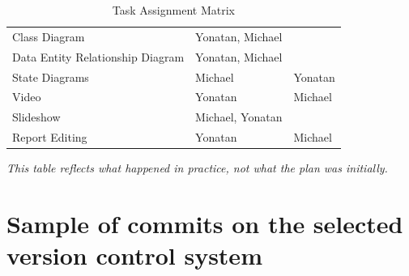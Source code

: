 \documentclass[11pt]{article}
\begin{document}
\begin{table}[H]
\begin{tabular}{lll}
            Class Diagram                      & Yonatan, Michael    &                  \\
            Data Entity Relationship Diagram   & Yonatan, Michael    &                  \\
            State Diagrams                     & Michael             & Yonatan          \\
            Video                              & Yonatan             & Michael          \\
            Slideshow                          & Michael, Yonatan    &                  \\
            Report Editing                     & Yonatan             & Michael          \\
            \bottomrule
        \end{tabular}
        \caption{Task Assignment Matrix}\label{tab:table}
    \end{table}

    \textsl{This table reflects what happened in practice, not what the plan was initially.}

    \begin{figure}
        \label{fig:Gant Chart} %
    \end{figure}
    \pagebreak

    \section{Sample of commits on the selected version control system}



    \pagebreak


%
%
\end{document}

